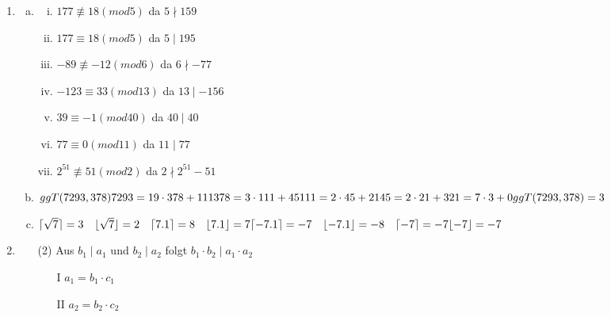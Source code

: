 \documentclass[a4paper]{scrartcl}
\title{\titleinfo}
\author{Elena Noll, Sven-Hendrik Haase, Arne Feil}
\date{\today}
\begin{document}
\maketitle
\begin{enumerate}[1.]
\item
\begin{enumerate}[a)]
\item
\begin{enumerate}[(i)]
\item $177 \not\equiv 18 (mod 5)$ da $5 \nmid 159$
\item $177 \equiv 18 (mod 5)$ da $5 \mid 195$
\item $-89\not\equiv -12 (mod 6)$ da $6 \nmid -77$
\item $-123 \equiv 33 (mod 13)$ da $13 \mid -156$
\item $39 \equiv -1 (mod 40)$ da $40 \mid 40$
\item $77 \equiv 0 (mod 11)$ da $11 \mid 77$
\item $2^{51} \not\equiv 51 (mod 2)$ da $2 \nmid 2^{51}-51$\\
\end{enumerate}
\item
$ggT(7293,378) \\
7293 = 19 \cdot 378 + 111 \\
378 = 3 \cdot 111 + 45 \\
111 = 2 \cdot 45 + 21 \\
45 = 2 \cdot 21 + 3 \\
21 = 7 \cdot 3 + 0 \\ \\
ggT(7293,378)=3$\\
\item
$\lceil\sqrt{7}\rceil = 3 \quad \lfloor\sqrt{7}\rfloor = 2 \quad \lceil7.1\rceil = 8 \quad \lfloor7.1\rfloor = 7 \\
\lceil-7.1\rceil = -7 \quad \lfloor-7.1\rfloor = -8 \quad \lceil-7\rceil = -7 \lfloor-7\rfloor = -7$\\
\end{enumerate}
\item
\begin{enumerate}
\item[(2)]
Aus $b_1 \mid a_1$ und $b_2 \mid a_2$ folgt $b_1 \cdot b_2 \mid a_1 \cdot a_2$ \\
\begin{enumerate}
\item[I] $a_1 = b_1 \cdot c_1$
\item[II] $a_2 = b_2 \cdot c_2$\\

\end{enumerate}
\end{enumerate}
\end{enumerate}
\end{document}
